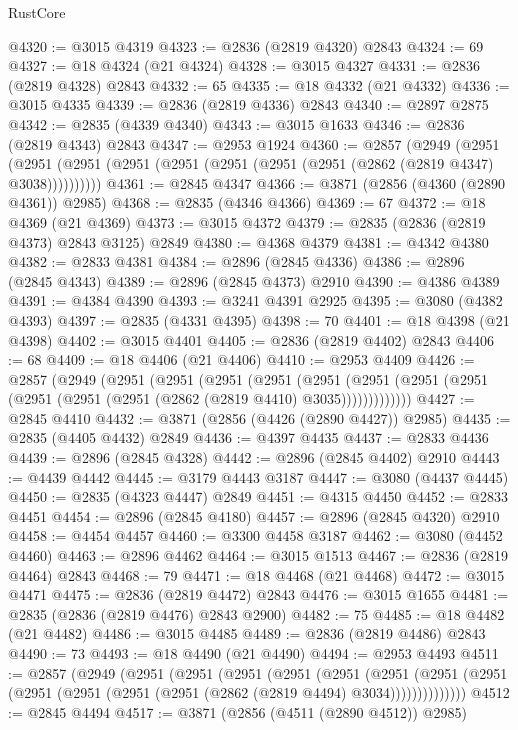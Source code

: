 \begin{lexlean}{RustCore}
\begin{coremodule}
@4320 := @3015 @4319
@4323 := @2836 (@2819 @4320) @2843
@4324 := 69
@4327 := @18 @4324 (@21 @4324)
@4328 := @3015 @4327
@4331 := @2836 (@2819 @4328) @2843
@4332 := 65
@4335 := @18 @4332 (@21 @4332)
@4336 := @3015 @4335
@4339 := @2836 (@2819 @4336) @2843
@4340 := @2897 @2875
@4342 := @2835 (@4339 @4340)
@4343 := @3015 @1633
@4346 := @2836 (@2819 @4343) @2843
@4347 := @2953 @1924
@4360 := @2857
    (@2949
      (@2951 (@2951 (@2951 (@2951 (@2951 (@2951 (@2951 (@2951 (@2862 (@2819 @4347) @3038))))))))))
@4361 := @2845 @4347
@4366 := @3871 (@2856 (@4360 (@2890 @4361)) @2985)
@4368 := @2835 (@4346 @4366)
@4369 := 67
@4372 := @18 @4369 (@21 @4369)
@4373 := @3015 @4372
@4379 := @2835 (@2836 (@2819 @4373) @2843 @3125) @2849
@4380 := @4368 @4379
@4381 := @4342 @4380
@4382 := @2833 @4381
@4384 := @2896 (@2845 @4336)
@4386 := @2896 (@2845 @4343)
@4389 := @2896 (@2845 @4373) @2910
@4390 := @4386 @4389
@4391 := @4384 @4390
@4393 := @3241 @4391 @2925
@4395 := @3080 (@4382 @4393)
@4397 := @2835 (@4331 @4395)
@4398 := 70
@4401 := @18 @4398 (@21 @4398)
@4402 := @3015 @4401
@4405 := @2836 (@2819 @4402) @2843
@4406 := 68
@4409 := @18 @4406 (@21 @4406)
@4410 := @2953 @4409
@4426 := @2857
    (@2949
      (@2951
        (@2951
          (@2951
            (@2951
              (@2951
                (@2951 (@2951 (@2951 (@2951 (@2951 (@2951 (@2862 (@2819 @4410) @3035)))))))))))))
@4427 := @2845 @4410
@4432 := @3871 (@2856 (@4426 (@2890 @4427)) @2985)
@4435 := @2835 (@4405 @4432) @2849
@4436 := @4397 @4435
@4437 := @2833 @4436
@4439 := @2896 (@2845 @4328)
@4442 := @2896 (@2845 @4402) @2910
@4443 := @4439 @4442
@4445 := @3179 @4443 @3187
@4447 := @3080 (@4437 @4445)
@4450 := @2835 (@4323 @4447) @2849
@4451 := @4315 @4450
@4452 := @2833 @4451
@4454 := @2896 (@2845 @4180)
@4457 := @2896 (@2845 @4320) @2910
@4458 := @4454 @4457
@4460 := @3300 @4458 @3187
@4462 := @3080 (@4452 @4460)
@4463 := @2896 @4462
@4464 := @3015 @1513
@4467 := @2836 (@2819 @4464) @2843
@4468 := 79
@4471 := @18 @4468 (@21 @4468)
@4472 := @3015 @4471
@4475 := @2836 (@2819 @4472) @2843
@4476 := @3015 @1655
@4481 := @2835 (@2836 (@2819 @4476) @2843 @2900)
@4482 := 75
@4485 := @18 @4482 (@21 @4482)
@4486 := @3015 @4485
@4489 := @2836 (@2819 @4486) @2843
@4490 := 73
@4493 := @18 @4490 (@21 @4490)
@4494 := @2953 @4493
@4511 := @2857
    (@2949
      (@2951
        (@2951
          (@2951
            (@2951
              (@2951
                (@2951
                  (@2951 (@2951 (@2951 (@2951 (@2951 (@2951 (@2862 (@2819 @4494) @3034))))))))))))))
@4512 := @2845 @4494
@4517 := @3871 (@2856 (@4511 (@2890 @4512)) @2985)

\end{coremodule}
\end{lexlean}

